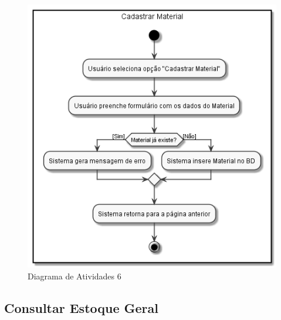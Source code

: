\documentclass[rascunho,xindy,acronym,symbols]{fei}
\begin{document}
\begin{figure}[H]
    \centering
    \includegraphics[scale=0.6, width=400pt]{./Images/Cadastrar_Material.png}
    \caption{Diagrama de Atividades 6}
    \label{fig:diag_atv6}
\end{figure}

\subsection{Consultar Estoque Geral}
\end{document}
